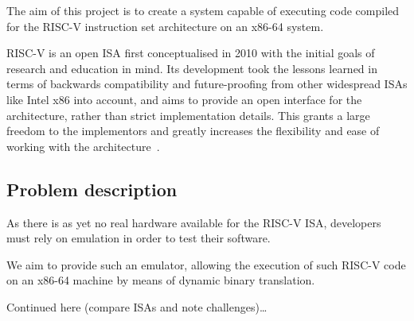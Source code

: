 The aim of this project is to create a system capable of executing code compiled for the RISC-V instruction set architecture on an x86-64 system.

RISC-V is an open ISA first conceptualised in 2010 with the initial goals of research and education in mind.
Its development took the lessons learned in terms of backwards compatibility and future-proofing from other widespread ISAs like Intel x86 into account, and aims to provide an open interface for the architecture, rather than strict implementation details.
This grants a large freedom to the implementors and greatly increases the flexibility and ease of working with the architecture~\cite[S. 1f]{riscvspec}.

\subsection{Problem description}
As there is as yet no real hardware available for the RISC-V ISA, developers must rely on emulation in order to test their software.

We aim to provide such an emulator, allowing the execution of such RISC-V code on an x86-64 machine by means of dynamic binary translation.

Continued here (compare ISAs and note challenges)\ldots
